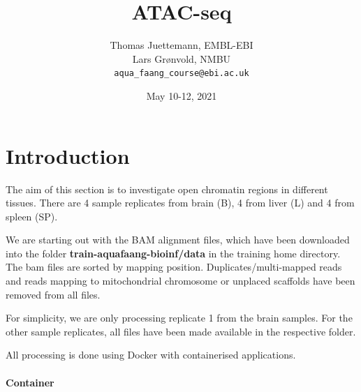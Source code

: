 \documentclass[12pt]{article}
\begin{document}
	
	\title{ATAC-seq} 
	\author{Thomas Juettemann, EMBL-EBI\\
		Lars Gr\o nvold, NMBU\\		
		\texttt{aqua\_faang\_course@ebi.ac.uk}}  %
	\date{May 10-12, 2021}  %
	\maketitle
	
	
	
	
	\section{Introduction}
	The aim of this section  is to investigate open chromatin regions in different tissues.  
	There are 4 sample replicates from brain (B), 4 from liver (L) and 4 from spleen (SP). 
	
	We are starting out with the BAM alignment files, which have been downloaded into the folder \textbf{train-aquafaang-bioinf/data} in the training home directory. The bam files are sorted by mapping position. Duplicates/multi-mapped reads and reads mapping to mitochondrial chromosome or unplaced scaffolds have been removed from all files.
	
	For simplicity, we are only processing replicate 1 from the brain samples. For the other sample replicates, all files have been made available in the respective folder.
	
	All processing is done using Docker with containerised applications. 

		\paragraph{Container}
\end{document}
